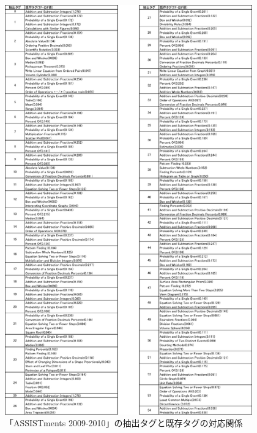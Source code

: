 \begin{figure}[p]
\begin{center}
\includegraphics[height=500pt]{./img/aTable.png}
\end{center}
\caption{「ASSISTments 2009-2010」の抽出タグと既存タグの対応関係}
\label{fig:aTable}
\end{figure}

